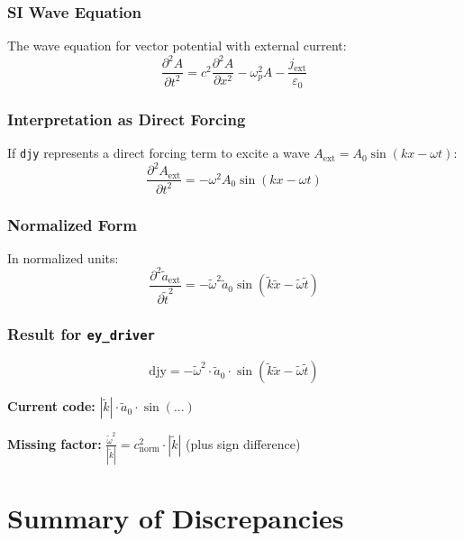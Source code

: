 \documentclass[11pt]{article}
\begin{document}
\subsubsection{SI Wave Equation}
The wave equation for vector potential with external current:
\begin{equation}
    \frac{\partial^2 A}{\partial t^2} = c^2 \frac{\partial^2 A}{\partial x^2} - \omega_p^2 A - \frac{j_{\text{ext}}}{\varepsilon_0}
\end{equation}

\subsubsection{Interpretation as Direct Forcing}
If \texttt{djy} represents a direct forcing term to excite a wave $A_{\text{ext}} = A_0 \sin(kx - \omega t)$:
\begin{equation}
    \frac{\partial^2 A_{\text{ext}}}{\partial t^2} = -\omega^2 A_0 \sin(kx - \omega t)
\end{equation}

\subsubsection{Normalized Form}
In normalized units:
\begin{equation}
    \frac{\partial^2 \tilde{a}_{\text{ext}}}{\partial \tilde{t}^2} = -\tilde{\omega}^2 \tilde{a}_0 \sin(\tilde{k}\tilde{x} - \tilde{\omega}\tilde{t})
\end{equation}

\subsubsection{Result for \texttt{ey\_driver}}
\begin{equation}
    \boxed{\text{djy} = -\tilde{\omega}^2 \cdot \tilde{a}_0 \cdot \sin(\tilde{k}\tilde{x} - \tilde{\omega}\tilde{t})}
\end{equation}

\textbf{Current code:} $|\tilde{k}| \cdot \tilde{a}_0 \cdot \sin(...)$

\textbf{Missing factor:} $\displaystyle\frac{\tilde{\omega}^2}{|\tilde{k}|} = c_{\text{norm}}^2 \cdot |\tilde{k}|$ (plus sign difference)

\newpage
\section{Summary of Discrepancies}
\end{document}
